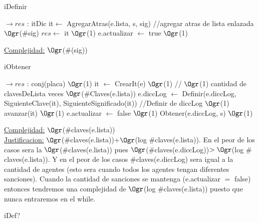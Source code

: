 \begin{Representacion}
\begin{Algoritmos}
	\begin{algorithm}[H]
		\caption{iDefinir}
		\begin{algorithmic}[1]
			 $\to res$ : itDic
			\State it$\leftarrow$ AgregarAtras(e.lista, s, sig) //agregar atras de lista enlazada \Comment $\Ogr$($\#$sig)
			\State $res \leftarrow$ it \Comment $\Ogr$(1)
			\State e.actualizar $\leftarrow$ true \Comment $\Ogr$(1) 
			\EndProcedure
		\end{algorithmic}
		\underline{Complejidad:} $\Ogr$($\#$(sig))
	\end{algorithm}

	\begin{algorithm}[H]
		\caption{iObtener}
		\begin{algorithmic}[1]
			 $\to res$ : conj(placa)
			 \Comment $\Ogr$(1)
				\State it $\leftarrow$ CrearIt(e) \Comment $\Ogr$(1)
				 // $\Ogr$(1) cantidad de clavesDeLista veces \Comment $\Ogr$($\#$Claves(e.lista))
					\State e.diccLog $\leftarrow$ Definir(e.diccLog, SiguienteClave(it), SiguienteSignificado(it)) //Definir de diccLog \Comment $\Ogr$(1) 
					\State avanzar(it) \Comment $\Ogr$(1) 
				\EndWhile
				\State e.actualizar $\leftarrow$ false \Comment $\Ogr$(1) 
			\EndIf
			\State Obtener(e.diccLog, s) $\Ogr$(1)
			\EndProcedure
		\end{algorithmic}
		\underline{Complejidad:} $\Ogr$($\#$claves(e.lista))
		\\
		\underline{Justificacion:} $\Ogr$($\#$claves(e.lista))+$\Ogr$(log $\#$claves(e.lista)). En el peor de los casos sera la $\Ogr$($\#$claves(e.lista)) pues $\Ogr$($\#$claves(e.diccLog))$>\Ogr$(log $\#$claves(e.lista)). Y en el peor de los casos $\#$claves(e.diccLog) sera igual a la cantidad de agentes (esto sera cuando todos los agentes tengan diferentes sanciones). Cuando la cantidad de sanciones se mantenga (e.actualizar $=$ false) entonces tendremos una complejidad de $\Ogr$(log $\#$claves(e.lista)) puesto que nunca entraremos en el while.
	\end{algorithm}	
	
	\begin{algorithm}[H]
		\caption{iDef?}
		

\end{algorithm}
\end{Algoritmos}
\end{Representacion}
